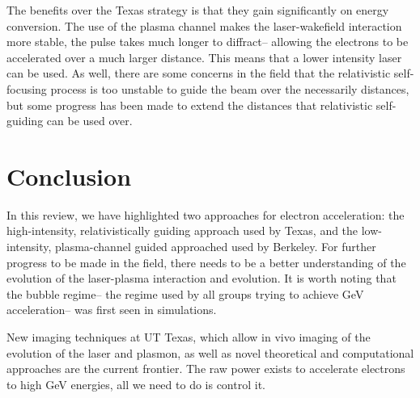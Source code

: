 \documentclass[12pt,letter]{article}
\begin{document}
The benefits over the Texas strategy is that they gain significantly on energy
conversion.  The use of the plasma channel makes the laser-wakefield interaction
more stable, the pulse takes much longer to diffract-- allowing the electrons to
be accelerated over a much larger distance. This means that a lower intensity
laser can be used. 
 As well, there are some concerns in the field
that the relativistic self-focusing process is too unstable to guide the beam
over the necessarily distances\cite{RevModPhys.81.1229}, but some progress has
been made to extend the distances that relativistic self-guiding can be used
over\cite{PhysRevLett.113.245001}.


\section{Conclusion}
In this review, we have highlighted two approaches for electron acceleration:
the high-intensity, relativistically guiding approach used by Texas, and the
low-intensity, plasma-channel guided approached used by Berkeley. For further
progress to be made in the field, there needs to be a better understanding of
the evolution of the laser-plasma interaction and evolution. It is worth noting
that the bubble regime-- the regime used by all groups trying to achieve GeV
acceleration-- was first seen in simulations. 

New imaging techniques at UT Texas, which allow in vivo imaging of the evolution
of the laser and plasmon, as well as novel theoretical and computational
approaches are the current frontier. The raw power exists to accelerate
electrons to high GeV energies, all we need to do is control it.

\end{document}
